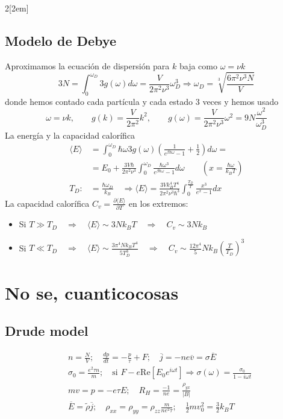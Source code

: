 \documentclass[leqno]{article}
\begin{document}
\begin{multicols}{2}[\columnsep2em]
\subsection{Modelo de Debye}
Aproximamos la ecuación de dispersión para $k$ baja como  $\omega = \nu k$
\[
  3N = \int_0^{\omega _D} 3g(\omega )d\omega = \frac{V}{2\pi^2 \nu^3}\omega _D^3 \Rightarrow \boxed{\omega _D = \sqrt[3]{\frac{6\pi^2\nu^3N}{V}} }
\] 
donde hemos contado cada partícula y cada estado 3 veces y hemos usado
\[
\omega = \nu k, \qquad g(k)=\frac{V}{2\pi^2}k^2, \qquad g(\omega )= \frac{V}{2\pi^2 \nu^3}\omega ^2 = 9N \frac{\omega ^2}{\omega ^3_D}
\]
La energía y la capacidad calorífica
\begin{align*}
  \langle E \rangle &= \int_0^{\omega _D}\hbar \omega 3g(\omega )\left( \frac{1}{e^{\beta \hbar \omega }-1} +\frac{1}{2} \right) d\omega  =\\
					&=E_0 + \frac{3V\hbar }{2\pi^2\nu^3} \int_0^{\omega _D}\frac{\hbar \omega ^3}{e^{\beta \hbar \omega }-1} d\omega \qquad (x=\frac{\hbar \omega }{k_B T})\\
  T_D :&= \frac{\hbar \omega_D }{k_B} \quad   \Rightarrow  \boxed{\langle E \rangle = \frac{3Vk_B^4T^4}{2\pi^2\nu^3\hbar ^3}\int_0^{\frac{T_D}{T}}\frac{x^3}{e^x-1}dx }
\end{align*}
La capacidad calorífica $C_v = \frac{\partial \langle E \rangle }{\partial T}$ en los extremos:
\begin{itemize}[topsep=-6pt, itemsep=0pt]
  \item Si $T\gg T_D \quad \Rightarrow \quad \langle E \rangle \sim 3Nk_BT \quad \Rightarrow \quad C_v \sim  3Nk_B $
  \item Si $T\ll T_D \quad \Rightarrow \quad \langle E \rangle \sim  \frac{3\pi^4Nk_BT^4}{5T_D^3}\quad\Rightarrow \quad C_v \sim  \frac{12\pi^4}{5}Nk_B \left( \frac{T}{T_D} \right)^3 $
\end{itemize}

\section{No se, cuanticocosas}
\subsection{Drude model}
\begin{align*}
  &n=\frac{N}{V}; \quad\frac{dp}{dt} = -\frac{p}{\tau}+F; \quad \overline{j} = -ne \overline{v} = \sigma \overline{E}\\
  & \sigma _0 = \frac{e^2\tau n}{m}; \quad \text{si } F -e\text{Re}[E_0e ^{i\omega t}] \Rightarrow \sigma (\omega ) = \frac{\sigma _0}{1-i\omega t}\\
  & mv=p=-e\tau E; \quad R_H = \frac{-1}{ne} = \frac{\rho_{yx}}{|B|}\\
  &\overline{E} = \tilde{\rho }\overline{j}; \quad \rho _{x x} = \rho _{yy}=\rho _{zz} \frac{m}{ne^2\tau }; \quad \frac{1}{2}mv_0^2= \frac{3}{2}k_BT
\end{align*}


\end{multicols}
\end{document}
